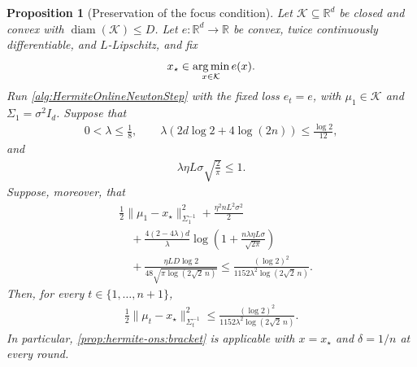 \documentclass{article}
\theoremstyle{plain}
\newtheorem{proposition}[theorem]{Proposition}
\theoremstyle{definition}
\theoremstyle{plain}
\newcommand{\R}{\mathbb R}
\newcommand{\argmin}{\operatornamewithlimits{arg\,min}}
\newcommand{\cK}{\mathcal K}
\begin{document}
\begin{proposition}[Preservation of the focus condition]
    \label{prop:hermite-ons:focus}
    Let $\cK\subseteq\R^d$ be closed and convex with
    $\operatorname{diam}(\cK)\leq D$. Let
    $e:\R^d\to\R$ be convex, twice continuously differentiable, and
    $L$-Lipschitz, and fix
    \[
        x_\star\in\argmin_{x\in\cK}e(x).
    \]
    Run \cref{alg:HermiteOnlineNewtonStep} with the fixed loss
    $e_t=e$, with $\mu_1\in\cK$ and
    $\Sigma_1=\sigma^2I_d$. Suppose that
    \begin{align}
        0<\lambda\leq\frac18,
        \qquad
        \lambda
        \left(
        2d\log2+4\log(2n)
        \right)
        \leq
        \frac{\log2}{12},
        \label{eq:hermite-ons:focus-dimension}
    \end{align}
    and
    \begin{align}
        \lambda\eta L\sigma\sqrt{\frac{2}{\pi}}\leq1.
        \label{eq:hermite-ons:focus-step-size}
    \end{align}
    Suppose, moreover, that
    \begin{align}
         & \frac12
        \|\mu_1-x_\star\|_{\Sigma_1^{-1}}^2
        +
        \frac{\eta^2nL^2\sigma^2}{2}
        \nonumber  \\
         & \quad+
        \frac{4(2-4\lambda)d}{\lambda}
        \log\left(
        1+\frac{n\lambda\eta L\sigma}{\sqrt{2\pi}}
        \right)
        \nonumber  \\
         & \quad+
        \frac{\eta LD\log2}
        {48\sqrt{\pi\log(2\sqrt2\,n)}}
        \leq
        \frac{(\log2)^2}
        {1152\lambda^2\log(2\sqrt2\,n)}.
        \label{eq:hermite-ons:focus-sufficient}
    \end{align}
    Then, for every $t\in\{1,\ldots,n+1\}$,
    \begin{align}
        \frac12
        \|\mu_t-x_\star\|_{\Sigma_t^{-1}}^2
        \leq
        \frac{(\log2)^2}
        {1152\lambda^2\log(2\sqrt2\,n)}.
        \label{eq:hermite-ons:focus-preserved}
    \end{align}
    In particular, \cref{prop:hermite-ons:bracket} is applicable with
    $x=x_\star$ and $\delta=1/n$ at every round.
\end{proposition}
\end{document}
